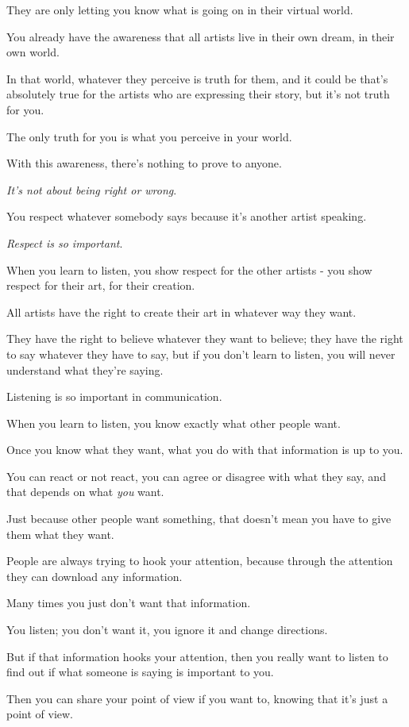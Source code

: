 \documentclass{article}
\numberwithin{equation}{section}
\begin{document}
They are only letting you know what is going on in their virtual world.

%
You already have the awareness that all artists live in their own dream, in their own world.

In that world, whatever they perceive is truth for them, and it could be that's absolutely true for the artists who are expressing their story, but it's not truth for you.

The only truth for you is what you perceive in your world.

With this awareness, there's nothing to prove to anyone.

\textit{It's not about being right or wrong}.

You respect whatever somebody says because it's another artist speaking.

\textit{Respect is so important}.

When you learn to listen, you show respect for the other artists - you show respect for their art, for their creation.

%
All artists have the right to create their art in whatever way they want.

They have the right to believe whatever they want to believe; they have the right to say whatever they have to say, but if you don't learn to listen, you will never understand what they're saying.

Listening is so important in communication.

When you learn to listen, you know exactly what other people want.

Once you know what they want, what you do with that information is up to you.

You can react or not react, you can agree or disagree with what they say, and that depends on what \textit{you} want.

%
Just because other people want something, that doesn't mean you have to give them what they want.

People are always trying to hook your attention, because through the attention they can download any information.

Many times you just don't want that information.

You listen; you don't want it, you ignore it and change directions.

But if that information hooks your attention, then you really want to listen to find out if what someone is saying is important to you.

Then you can share your point of view if you want to, knowing that it's just a point of view.
\end{document}
